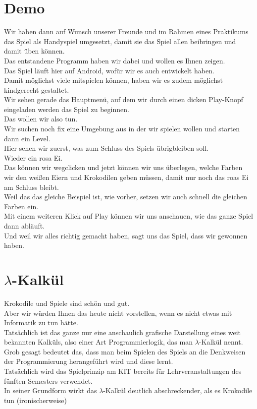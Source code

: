 \documentclass{scrartcl}
\begin{document}
	\section{Demo}
	Wir haben dann auf Wunsch unserer Freunde und im Rahmen eines Praktikums das Spiel als Handyspiel umgesetzt, damit sie das Spiel allen beibringen und damit üben können.\\
	Das entstandene Programm haben wir dabei und wollen es Ihnen zeigen.\\
	Das Spiel läuft hier auf Android, wofür wir es auch entwickelt haben.\\
	Damit möglichst viele mitspielen können, haben wir es zudem möglichst kindgerecht gestaltet.\\
	Wir sehen gerade das Hauptmenü, auf dem wir durch einen dicken Play-Knopf eingeladen werden das Spiel zu beginnen.\\
	Das wollen wir also tun.\\
	Wir suchen noch fix eine Umgebung aus in der wir spielen wollen und starten dann ein Level.\\
	Hier sehen wir zuerst, was zum Schluss des Spiels übrigbleiben soll.\\
	Wieder ein rosa Ei.\\
	Das können wir wegclicken und jetzt können wir uns überlegen, welche Farben wir den weißen Eiern und Krokodilen geben müssen, damit nur noch das roas Ei am Schluss bleibt.\\
	Weil das das gleiche Beispiel ist, wie vorher, setzen wir auch schnell die gleichen Farben ein.\\
	Mit einem weiteren Klick auf Play können wir uns anschauen, wie das ganze Spiel dann abläuft.\\
	Und weil wir alles richtig gemacht haben, sagt uns das Spiel, dass wir gewonnen haben.\\
	
	\section{$\lambda$-Kalkül}
	Krokodile und Spiele sind schön und gut.\\
	Aber wir würden Ihnen das heute nicht vorstellen, wenn es nicht etwas mit Informatik zu tun hätte.\\
	Tatsächlich ist das ganze nur eine anschaulich grafische Darstellung eines weit bekannten Kalküls, also einer Art Programmierlogik, das man $\lambda$-Kalkül nennt.\\
	Grob gesagt bedeutet das, dass man beim Spielen des Spiels an die Denkweisen der Programmierung herangeführt wird und diese lernt.\\
	Tatsächlich wird das Spielprinzip am KIT bereits für Lehrveranstaltungen des fünften Semesters verwendet.\\
	In seiner Grundform wirkt das $\lambda$-Kalkül deutlich abschreckender, als es Krokodile tun (ironischerweise)\\
	
\end{document}
